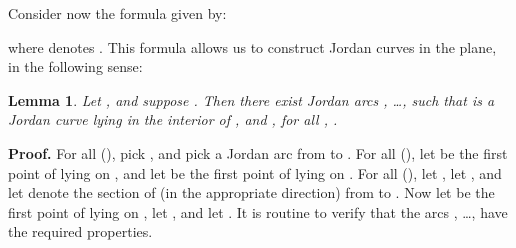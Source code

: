 \documentclass{article}
\newtheorem{lemma}[theorem]{Lemma}
\newcommand{\qedsymbol}{\ding{113}}
\newenvironment{proof}{\par\noindent\textbf{Proof.}}{\mbox{}\hfill\qedsymbol\par\bigskip}
\begin{document}
Consider now the formula  given by:

where  denotes .  This formula allows us to
construct Jordan curves in the plane, in the following sense:
\begin{lemma}\label{lma:FrameLemmaInt}
	Let , and suppose .
        Then there exist Jordan arcs , \ldots, 
        such that  is a Jordan curve lying in
        the interior of , and , for all , .
\end{lemma}
\begin{proof}
For all  (), pick , and pick a Jordan arc
 from  to .  
For all  (), let  be the first point
of  lying on , and let  be the
first point of  lying on . For all  (), let , let , and let  denote the section of
 (in the appropriate direction) from  to . Now
let  be the first point of  lying on
, let , and let . It is routine to verify that the arcs
, \ldots,  have the required properties.
\end{proof}
\end{document}
